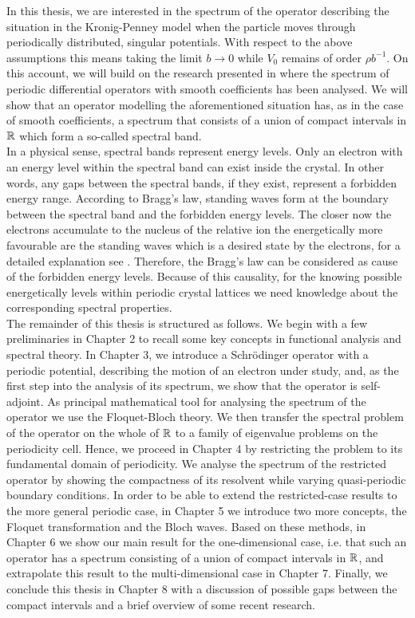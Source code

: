 In this thesis, we are interested in the spectrum of the operator describing the situation in the Kronig-Penney model when the particle moves through periodically distributed, singular potentials. With respect to the above assumptions	 this means taking the limit $b \rightarrow 0$ while $V_{0}$ remains of order $\rho b^{-1}$. On this account, we will build on the research presented in \cite{dorfler2011photonic} where the spectrum of periodic differential operators with smooth coefficients has been analysed. We will show that an operator modelling the aforementioned situation has, as in the case of smooth coefficients, a spectrum that consists of a union of compact intervals in $\mathbb{R}$ which form a so-called spectral band. 
~\\

In a physical sense, spectral bands represent energy levels. Only an electron with an energy level within the spectral band can exist inside the crystal. In other words, any gaps between the spectral bands, if they exist, represent a forbidden energy range. According to Bragg's law, standing waves form at the boundary between the spectral band and the forbidden energy levels. The closer now the electrons accumulate to the nucleus of the relative ion the energetically more favourable are the standing waves which is a desired state by the electrons, for a detailed explanation see \cite[Section 3.2]{heering2002elektrophysik}. Therefore, the Bragg's law can be considered as cause of the forbidden energy levels. Because of this causality, for the knowing possible energetically levels within periodic crystal lattices we need knowledge about the corresponding spectral properties.
~\\

The remainder of this thesis is structured as follows. We begin with a few preliminaries in Chapter 2 to recall some key concepts in functional analysis and spectral theory. In Chapter 3, we introduce a Schrödinger operator with a periodic potential, describing the motion of an electron under study, and, as the first step into the analysis of its spectrum, we show that the operator is self-adjoint. As principal mathematical tool for analysing the spectrum of the operator we use the Floquet-Bloch theory. We then transfer the spectral problem of the operator on the whole of $\mathbb{R}$ to a family of eigenvalue problems on the periodicity cell. Hence, we proceed in Chapter 4 by restricting the problem to its fundamental domain of periodicity. We analyse the spectrum of the restricted operator by showing the compactness of its resolvent while varying quasi-periodic boundary conditions. In order to be able to extend the restricted-case results to the more general periodic case, in Chapter 5 we introduce two more concepts, the Floquet transformation and the Bloch waves. Based on these methods, in Chapter 6 we show our main result for the one-dimensional case, i.e. that such an operator has a spectrum consisting of a union of compact intervals in $\mathbb{R}$, and extrapolate this result to the multi-dimensional case in Chapter 7. Finally, we conclude this thesis in Chapter 8 with a discussion of possible gaps between the compact intervals and a brief overview of some recent research.